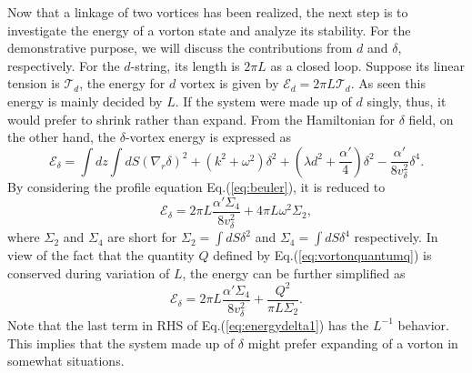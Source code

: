 \documentclass[12pt]{article}
\begin{document}
Now that a linkage of two vortices has been realized, the next step is to investigate the energy of a vorton state
and analyze its stability. For the demonstrative purpose, we will discuss the contributions from $d$ and
$\delta$, respectively. For the $d$-string, its length is $2 \pi L$ as a closed loop.
Suppose its linear tension is $\mathcal{T}_d$, the energy for $d$ vortex is given by
$\mathcal{E}_d = 2\pi L \mathcal{T}_d$. As seen this energy is mainly decided by $L$. 
If the system were made up of $d$ singly, thus, it would prefer to shrink
rather than expand.
From the Hamiltonian for $\delta$ field, on the other hand, the $\delta$-vortex energy is expressed as 
\begin{equation}
  \label{eq:deltah}
  \mathcal{E}_\delta = \int dz \int dS  (\nabla_r \delta)^2 + (k^2 + \omega^2)\delta^2 + (\lambda d^2 + \frac{\alpha'}{4})\delta^2 - \frac{\alpha'}{8v_\delta^2}\delta^4.
\end{equation}
By considering the profile equation Eq.(\ref{eq:beuler}), it is reduced to
\begin{equation}
  \label{eq:energydelta}
  \mathcal{E}_{\delta} =  2\pi L\frac{\alpha' \Sigma_4}{8v_\delta^2} + 4 \pi L \omega^2 \Sigma_2,
\end{equation}
where $\Sigma_2$ and $\Sigma_4$ are short for
$\Sigma_2 = \int dS \delta^2$ and $\Sigma_4 = \int dS \delta^4$ respectively.
In view of the fact that the quantity $Q$ defined by Eq.(\ref{eq:vortonquantumq}) is
conserved during variation of $L$, the energy can be further simplified as
\begin{equation}
  \label{eq:energydelta1}
  \mathcal{E}_{\delta} =  2\pi L\frac{\alpha' \Sigma_4}{8v_\delta^2} + \frac{Q^2}{\pi L \Sigma_2}.
\end{equation}
Note that the last term in RHS of Eq.(\ref{eq:energydelta1}) has the
$L^{-1}$ behavior. 
This implies that the system made up of $\delta$ might prefer expanding of a vorton in somewhat situations.
%
\end{document}
